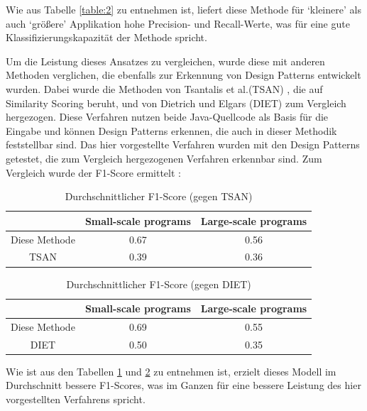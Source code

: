 \documentclass[conference]{IEEEtran}
\begin{document}
Wie aus Tabelle \ref{table:2} zu entnehmen ist, liefert diese Methode für `kleinere' als auch `größere' Applikation hohe Precision- und Recall-Werte, was für eine gute Klassifizierungskapazität der Methode spricht.

Um die Leistung dieses Ansatzes zu vergleichen, wurde diese mit anderen Methoden verglichen, die ebenfalls zur Erkennung von Design Patterns entwickelt wurden.
Dabei wurde die Methoden von Tsantalis et al.(TSAN) \cite{4015512}, die auf Similarity Scoring beruht, und von Dietrich und Elgars (DIET)\cite{DIETRICH2007108} zum Vergleich hergezogen. Diese Verfahren nutzen beide Java-Quellcode als Basis für die Eingabe und können Design Patterns erkennen, die auch in dieser Methodik feststellbar sind.
Das hier vorgestellte Verfahren wurden mit den Design Patterns getestet, die zum Vergleich hergezogenen Verfahren erkennbar sind. Zum Vergleich wurde der F1-Score ermittelt \cite[p. 9]{dodmetrics}:

\begin{table}[h]
    \centering
    \caption{Durchschnittlicher F1-Score (gegen TSAN)}
    \label{table:3}
    \begin{tabular}{|c|c|c|}
        \hline
                      & Small-scale programs & Large-scale programs \\
        \hline
        Diese Methode & 0.67                 & 0.56                 \\
        \hline
        TSAN          & 0.39                 & 0.36                 \\
        \hline
    \end{tabular}
\end{table}

\begin{table}[h]
    \centering
    \caption{Durchschnittlicher F1-Score (gegen DIET)}
    \label{table:4}
    \begin{tabular}{|c|c|c|}
        \hline
                      & Small-scale programs & Large-scale programs \\
        \hline
        Diese Methode & 0.69                 & 0.55                 \\
        \hline
        DIET          & 0.50                 & 0.35                 \\
        \hline
    \end{tabular}
\end{table}

Wie ist aus den Tabellen \ref{table:3} und \ref{table:4} zu entnehmen ist, erzielt dieses Modell im Durchschnitt bessere F1-Scores, was im Ganzen für eine bessere Leistung des hier vorgestellten Verfahrens spricht.
\end{document}
